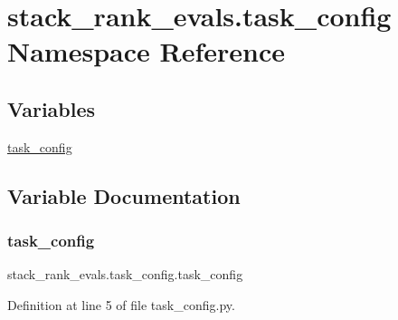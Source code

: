 \hypertarget{namespacestack__rank__evals_1_1task__config}{}\section{stack\+\_\+rank\+\_\+evals.\+task\+\_\+config Namespace Reference}
\label{namespacestack__rank__evals_1_1task__config}
\subsection*{Variables}
\begin{DoxyCompactItemize}
\item 
\hyperlink{namespacestack__rank__evals_1_1task__config_a9b5899c098ee8ba7dbf35ea12de0e248}{task\+\_\+config}
\end{DoxyCompactItemize}


\subsection{Variable Documentation}
\mbox{\label{namespacestack__rank__evals_1_1task__config_a9b5899c098ee8ba7dbf35ea12de0e248}} 
\subsubsection{\texorpdfstring{task\+\_\+config}{task\_config}}
{\footnotesize\ttfamily stack\+\_\+rank\+\_\+evals.\+task\+\_\+config.\+task\+\_\+config}



Definition at line 5 of file task\+\_\+config.\+py.

